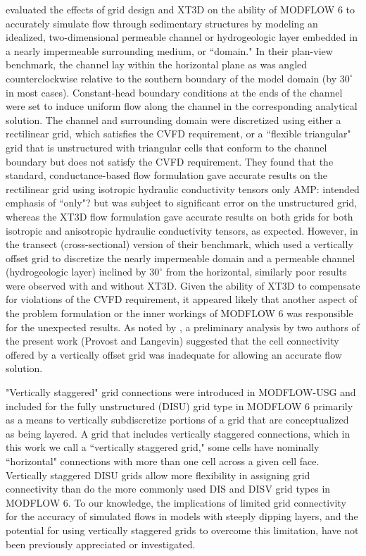 \documentclass{article}
\begin{document}
\cite{bardot2022} evaluated the effects of grid design and XT3D on the ability of MODFLOW 6 to accurately simulate flow through sedimentary structures by modeling an idealized, two-dimensional permeable channel or hydrogeologic layer embedded in a nearly impermeable surrounding medium, or ``domain." In their plan-view benchmark, the channel lay within the horizontal plane as was angled counterclockwise relative to the southern boundary of the model domain (by $30^{\circ}$ in most cases). Constant-head boundary conditions at the ends of the channel were set to induce uniform flow along the channel in the corresponding analytical solution. The channel and surrounding domain were discretized using either a rectilinear grid, which satisfies the CVFD requirement, or a ``flexible triangular" grid that is unstructured with triangular cells that conform to the channel boundary but does not satisfy the CVFD requirement. They found that the standard, conductance-based flow formulation gave accurate results on the rectilinear grid using isotropic hydraulic conductivity tensors only {\color{red} AMP: intended emphasis of ``only"?} but was subject to significant error on the unstructured grid, whereas the XT3D flow formulation gave accurate results on both grids for both isotropic and anisotropic hydraulic conductivity tensors, as expected. However, in the transect (cross-sectional) version of their benchmark, which used a vertically offset grid to discretize the nearly impermeable domain and a permeable channel (hydrogeologic layer) inclined by $30^{\circ}$ from the horizontal, similarly poor results were observed with and without XT3D. Given the ability of XT3D to compensate for violations of the CVFD requirement, it appeared likely that another aspect of the problem formulation or the inner workings of MODFLOW 6 was responsible for the unexpected results. As noted by \cite{bardot2022}, a preliminary analysis by two authors of the present work (Provost and Langevin) suggested that the cell connectivity offered by a vertically offset grid was inadequate for allowing an accurate flow solution. 

"Vertically staggered" grid connections were introduced in MODFLOW-USG \citep{modflowusg} and included for the fully unstructured (DISU) grid type in MODFLOW 6 \citep{modflow6gwf} primarily as a means to vertically subdiscretize portions of a grid that are conceptualized as being layered. A grid that includes vertically staggered connections, which in this work we call a ``vertically staggered grid," some cells have nominally ``horizontal" connections with more than one cell across a given cell face. Vertically staggered DISU grids allow more flexibility in assigning grid connectivity than do the more commonly used DIS and DISV grid types \citep{modflow6gwf} in MODFLOW 6. To our knowledge, the implications of limited grid connectivity for the accuracy of simulated flows in models with steeply dipping layers, and the potential for using vertically staggered grids to overcome this limitation, have not been previously appreciated or investigated.
\end{document}
